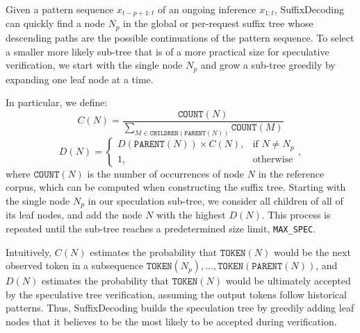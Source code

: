 Given a pattern sequence \( x_{t-p+1:t} \) of an ongoing inference \( x_{1:t} \), SuffixDecoding can quickly find a node \( N_p \) in the global or per-request suffix tree whose descending paths are the possible continuations of the pattern sequence. To select a smaller more likely sub-tree that is of a more practical size for speculative verification, we start with the single node \( N_p \) and grow a sub-tree greedily by expanding one leaf node at a time.

In particular, we define:
\[
C(N) = \frac{\texttt{COUNT}(N)}{\sum_{M \in \texttt{CHILDREN}(\texttt{PARENT}(N))} \texttt{COUNT}(M)}
\]
\[
D(N) = \begin{cases}
    D(\texttt{PARENT}(N)) \times C(N), & \text{if $N \neq N_p$}\\
    1, & \text{otherwise}
\end{cases},
\]
where \( \texttt{COUNT}(N) \) is the number of occurrences of node \( N \) in the reference corpus, which can be computed when constructing the suffix tree. Starting with the single node \( N_p \) in our speculation sub-tree, we consider all children of all of its leaf nodes, and add the node \( N \) with the highest \( D(N) \). This process is repeated until the sub-tree reaches a predetermined size limit, \texttt{MAX\_SPEC}.

Intuitively, \( C(N) \) estimates the probability that \( \texttt{TOKEN}(N) \) would be the next observed token in a subsequence \( \texttt{TOKEN}(N_p), \ldots, \texttt{TOKEN}(\texttt{PARENT}(N))\), and \( D(N) \) estimates the probability that \( \texttt{TOKEN}(N) \) would be ultimately accepted by the speculative tree verification, assuming the output tokens follow historical patterns.
Thus, SuffixDecoding builds the speculation tree by greedily adding leaf nodes that it believes to be the most likely to be accepted during verification.

